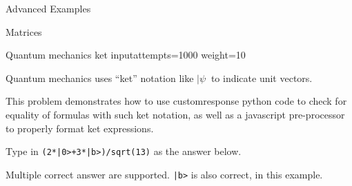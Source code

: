 \begin{edXchapter}{Advanced Examples}
\begin{edXsection}{Matrices}
\begin{edXvertical}
\begin{edXproblem}{Quantum mechanics ket input}{attempts=1000 weight=10}

Quantum mechanics uses ``ket'' notation like $|\psi\>$ to indicate unit
vectors.

This problem demonstrates how to use customresponse python code to
check for equality of formulas with such ket notation, as well as a
javascript pre-processor to properly format ket expressions.

Type in {\tt (2*|0>+3*|b>)/sqrt(13)} as the answer below.

Multiple correct answer are supported.  {\tt |b>} is also correct, in
this example.


\edXbr

%
%
%
%
% 
% 


%
%
%

\edXinline{$|\lambda\> = $ }
%


\end{edXproblem}
\end{edXvertical}
\end{edXsection}
\end{edXchapter}
